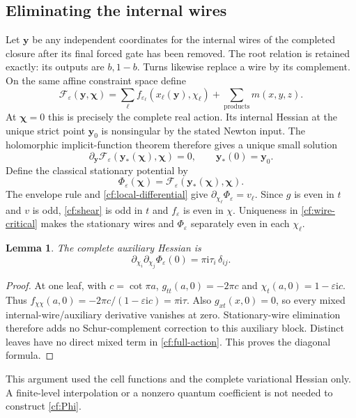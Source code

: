 \documentclass[11pt]{article}
\numberwithin{equation}{section}
\newtheorem{lemma}[theorem]{Lemma}
\theoremstyle{definition}\newtheorem{definition}[theorem]{Definition}
\theoremstyle{remark}\newtheorem{remark}[theorem]{Remark}
\newcommand{\ii}{\mathrm i}
\newcommand{\eps}{\varepsilon}
\begin{document}
\subsection{Eliminating the internal wires}
Let $\mathbf y$ be any independent coordinates for the internal
wires of the completed closure after its final forced gate has
been removed. The root relation is retained exactly: its outputs
are $b,1-b$. Turns likewise replace a wire by its complement.
On the same affine constraint space define
\begin{equation}\label{cf:full-action}
 \mathcal F_\eps(\mathbf y,\boldsymbol\chi)
   =\sum_{\ell} f_{\eps_\ell}(x_\ell(\mathbf y),\chi_\ell)
       +\sum_{\text{products}}m(x,y,z).
\end{equation}
At $\boldsymbol\chi=0$ this is precisely the complete real
action. Its internal Hessian at the unique strict point
$\mathbf y_0$ is nonsingular by the stated Newton input.
The holomorphic implicit-function theorem therefore gives
a unique small solution
\begin{equation}\label{cf:wire-critical}
 \partial_{\mathbf y}\mathcal F_\eps
       (\mathbf y_*(\boldsymbol\chi),\boldsymbol\chi)=0,\qquad
 \mathbf y_*(0)=\mathbf y_0 .
\end{equation}
Define the classical stationary potential by
\begin{equation}\label{cf:Phi}
 \Phi_\eps(\boldsymbol\chi)
       =\mathcal F_\eps(\mathbf y_*(\boldsymbol\chi),
                        \boldsymbol\chi).
\end{equation}
The envelope rule and \eqref{cf:local-differential} give
$\partial_{\chi_\ell}\Phi_\eps=v_\ell$.
Since $g$ is even in $t$ and $v$ is odd,
\eqref{cf:shear} is odd in $t$ and
$f_\eps$ is even in $\chi$. Uniqueness in
\eqref{cf:wire-critical} makes the stationary wires and
$\Phi_\eps$ separately even in each $\chi_\ell$.

\begin{lemma}\label{cf:hessian}
The complete auxiliary Hessian is
\begin{equation}\label{cf:hessian-equation}
 \partial_{\chi_i}\partial_{\chi_j}\Phi_\eps(0)
       =\pi\ii\tau_i\,\delta_{ij}.
\end{equation}
\end{lemma}
\begin{proof}
At one leaf, with $c=\cot\pi a$,
$g_{tt}(a,0)=-2\pi c$ and
$\chi_t(a,0)=1-\eps\ii c$. Thus
$f_{\chi\chi}(a,0)=-2\pi c/(1-\eps\ii c)=\pi\ii\tau$.
Also $g_{xt}(x,0)=0$, so every mixed internal-wire/auxiliary
derivative vanishes at zero. Stationary-wire elimination
therefore adds no Schur-complement correction to this
auxiliary block. Distinct leaves have no direct mixed term
in \eqref{cf:full-action}. This proves the diagonal formula.
\end{proof}

This argument used the cell functions and the complete variational
Hessian only. A finite-level interpolation or a nonzero quantum
coefficient is not needed to construct \eqref{cf:Phi}.



\end{document}
